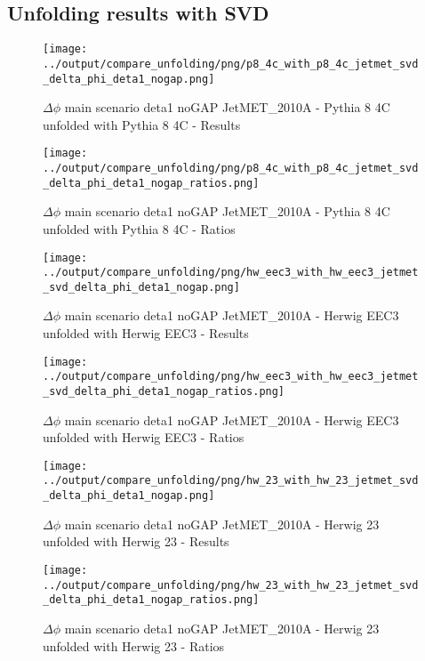 \documentclass[11pt]{book}
\begin{document}
\clearpage
\subsection{Unfolding results with SVD}

\begin{figure}[ht]
\centering
\texttt{[image: ../output/compare\_unfolding/png/p8\_4c\_with\_p8\_4c\_jetmet\_svd\_delta\_phi\_deta1\_nogap.png]}
\caption{$\Delta\phi$ main scenario deta1 noGAP JetMET\_2010A - Pythia 8 4C unfolded with Pythia 8 4C - Results}
\label{p8_p8_jetmet_svd_delta_phi_deta1_nogap_a}
\end{figure}

\begin{figure}[ht]
\centering
\texttt{[image: ../output/compare\_unfolding/png/p8\_4c\_with\_p8\_4c\_jetmet\_svd\_delta\_phi\_deta1\_nogap\_ratios.png]}
\caption{$\Delta\phi$ main scenario deta1 noGAP JetMET\_2010A - Pythia 8 4C unfolded with Pythia 8 4C - Ratios}
\label{p8_p8_jetmet_svd_delta_phi_deta1_nogap_b}
\end{figure}

\begin{figure}[ht]
\centering
\texttt{[image: ../output/compare\_unfolding/png/hw\_eec3\_with\_hw\_eec3\_jetmet\_svd\_delta\_phi\_deta1\_nogap.png]}
\caption{$\Delta\phi$ main scenario deta1 noGAP JetMET\_2010A - Herwig EEC3 unfolded with Herwig EEC3 - Results}
\label{hw_eec3_hw_eec3_jetmet_svd_delta_phi_deta1_nogap_a}
\end{figure}

\begin{figure}[ht]
\centering
\texttt{[image: ../output/compare\_unfolding/png/hw\_eec3\_with\_hw\_eec3\_jetmet\_svd\_delta\_phi\_deta1\_nogap\_ratios.png]}
\caption{$\Delta\phi$ main scenario deta1 noGAP JetMET\_2010A - Herwig EEC3 unfolded with Herwig EEC3 - Ratios}
\label{hw_eec3_hw_eec3_jetmet_svd_delta_phi_deta1_nogap_b}
\end{figure}

\begin{figure}[ht]
\centering
\texttt{[image: ../output/compare\_unfolding/png/hw\_23\_with\_hw\_23\_jetmet\_svd\_delta\_phi\_deta1\_nogap.png]}
\caption{$\Delta\phi$ main scenario deta1 noGAP JetMET\_2010A - Herwig 23 unfolded with Herwig 23 - Results}
\label{hw_23_hw_23_jetmet_svd_delta_phi_deta1_nogap_a}
\end{figure}

\begin{figure}[ht]
\centering
\texttt{[image: ../output/compare\_unfolding/png/hw\_23\_with\_hw\_23\_jetmet\_svd\_delta\_phi\_deta1\_nogap\_ratios.png]}
\caption{$\Delta\phi$ main scenario deta1 noGAP JetMET\_2010A - Herwig 23 unfolded with Herwig 23 - Ratios}
\label{hw_23_hw_23_jetmet_svd_delta_phi_deta1_nogap_b}
\end{figure}
\end{document}
